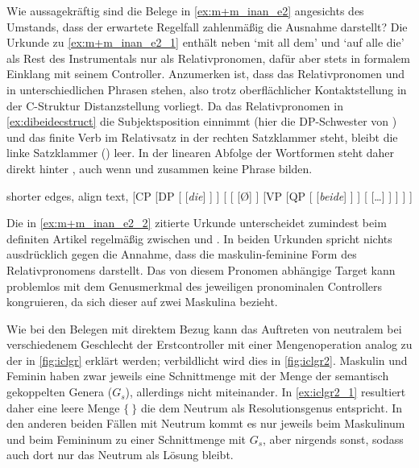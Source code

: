 Wie aussagekräftig sind die Belege in \cref{ex:m+m_inan_e2} angesichts des
Umstands, dass der erwartete Regelfall zahlenmäßig die Ausnahme darstellt? Die
Urkunde zu \cref{ex:m+m_inan_e2_1} enthält neben  `mit
all dem' und  `auf alle die' \autocite[\pno~2401,
487.11, 17]{cao3} als Rest des Instrumentals \autocite[vgl.][618]{ksw2} nur
 als Relativpronomen, dafür aber stets in formalem Einklang mit
seinem Controller. Anzumerken ist, dass das Relativpronomen und
 in unterschiedlichen Phrasen stehen, also trotz
oberflächlicher Kontaktstellung in der C-Struktur Distanzstellung vorliegt. Da
das Relativpronomen in \cref{ex:dibeidecstruct} die Subjektsposition einnimmt
(hier die DP-Schwester von ) und das finite Verb im Relativsatz in der
rechten Satzklammer steht, bleibt die linke Satzklammer () leer. In
der linearen Abfolge der Wortformen steht daher  direkt hinter
, auch wenn  und  zusammen keine Phrase bilden.
\begin{exe}
\ex \label{ex:dibeidecstruct}
	\begin{forest} shorter edges, align text,
	[CP
		[DP
			[
				[\textit{die}]
			]
		]
		[
			[
				[Ø]
			]
			[VP
				[QP
					[
						[\textit{beide}]
					]
				]
				[
					[\dots]
				]
			]
		]
	]
	\end{forest}
\end{exe}

Die in \cref{ex:m+m_inan_e2_2} zitierte Urkunde unterscheidet zumindest beim
definiten Artikel regelmäßig zwischen  und . In beiden
Urkunden spricht nichts ausdrücklich gegen die Annahme, dass  die maskulin-feminine Form des Relativpronomens darstellt. Das
von diesem Pronomen abhängige Target  kann problemlos mit dem
Genusmerkmal des jeweiligen pronominalen Controllers kongruieren, da sich
dieser auf zwei Maskulina bezieht.

Wie bei den Belegen mit direktem Bezug kann das Auftreten von neutralem
 bei verschiedenem Geschlecht der Erstcontroller mit einer
Mengenoperation analog zu der in \cref{fig:iclgr} erklärt werden; verbildlicht
wird dies in \cref{fig:iclgr2}. Maskulin und Feminin haben zwar jeweils eine
Schnittmenge mit der Menge der semantisch gekoppelten Genera ($G_s$),
allerdings nicht miteinander. In \cref{ex:iclgr2_1} resultiert daher eine leere
Menge $\{\ \}$ die dem Neutrum als Resolutionsgenus entspricht. In den anderen
beiden Fällen mit Neutrum  kommt es nur
jeweils beim Maskulinum und beim Femininum zu einer Schnittmenge mit $G_s$,
aber nirgends sonst, sodass auch dort nur das Neutrum als Lösung bleibt.

